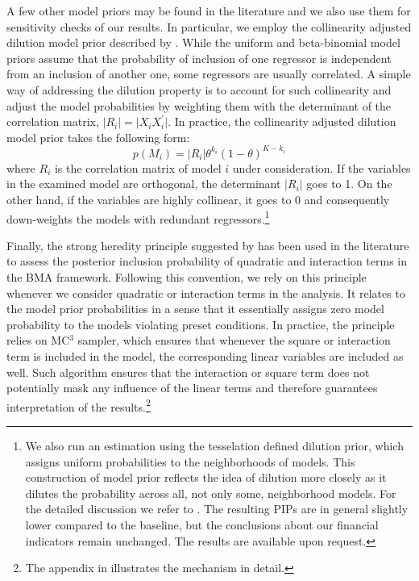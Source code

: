 A few other model priors may be found in the literature and we also use them for sensitivity checks of our results. In particular, we employ the collinearity adjusted dilution model prior described by \citet{george2010}. While the uniform and beta-binomial model priors assume that the probability of inclusion of one regressor is independent from an inclusion of another one, some regressors are usually correlated. A simple way of addressing the dilution property is to account for such collinearity and adjust the model probabilities by weighting them with the determinant of the correlation matrix, $\vert R_{i} \vert = \vert X_{i}^{}X_{i}^{\prime} \vert$. In practice, the collinearity adjusted dilution model prior takes the following form:
\begin{equation}
	p(M_{i})=\vert R_{i} \vert \theta^{k_{i}}(1-\theta)^{K-k_{i}}
\end{equation}
where $R_{i}$ is the correlation matrix of model $i$ under consideration. If the variables in the examined model are orthogonal, the determinant $\vert R_{i} \vert$ goes to 1. On the other hand, if the variables are highly collinear, it goes to 0 and consequently down-weights the models with redundant regressors.\footnote{We also run an estimation using the tesselation defined dilution prior, which assigns uniform probabilities to the neighborhoods of models. This construction of model prior reflects the idea of dilution more closely as it dilutes the probability across all, not only some, neighborhood models. For the detailed discussion we refer to \citet{george2010}. The resulting \acp{PIP} are in general slightly lower compared to the baseline, but the conclusions about our financial indicators remain unchanged. The results are available upon request.}

Finally, the strong heredity principle suggested by \citet{chipman1996} has been used in the literature to assess the posterior inclusion probability of quadratic and interaction terms in the \ac{BMA} framework. Following this convention, we rely on this principle whenever we consider quadratic or interaction terms in the analysis. It relates to the model prior probabilities in a sense that it essentially assigns zero model probability to the models violating preset conditions. In practice, the principle relies on MC$^{3}$ sampler, which ensures that whenever the square or interaction term is included in the model, the corresponding linear variables are included as well. Such algorithm ensures that the interaction or square term does not potentially mask any influence of the linear terms and therefore guarantees interpretation of the results.\footnote{The appendix in \citet{cuaresmaetal2014} illustrates the mechanism in detail.}

